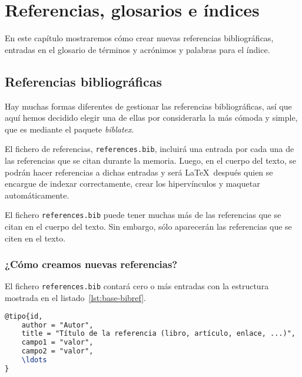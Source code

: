 \chapter{Referencias, glosarios e índices}
\label{ch:referencias}

En este capítulo mostraremos cómo crear nuevas referencias bibliográficas, entradas en el glosario de términos y acrónimos y palabras para el índice.

\section{Referencias bibliográficas}
\label{s:referencias-bibliograficas}

Hay muchas formas diferentes de gestionar las referencias bibliográficas, así que aquí hemos decidido elegir una de ellas por considerarla la más cómoda y simple, que es mediante el paquete \textit{biblatex}.

El fichero de referencias, \texttt{references.bib}, incluirá una entrada por cada una de las referencias que se citan durante la memoria. Luego, en el cuerpo del texto, se podrán hacer referencias a dichas entradas y será \LaTeX~después quien se encargue de indexar correctamente, crear los hipervínculos y maquetar automáticamente.

El fichero \texttt{references.bib} puede tener muchas más de las referencias que se citan en el cuerpo del texto. Sin embargo, sólo aparecerán las referencias que se citen en el texto.

 
\subsection{¿Cómo creamos nuevas referencias?}

El fichero \texttt{references.bib} contará cero o más entradas con la estructura mostrada en el listado~\ref{lst:base-bibref}.

\begin{lstlisting}[language=tex,caption=Estructura general de una referencia,label=lst:base-bibref]
@tipo{id,
    author = "Autor",
    title = "Título de la referencia (libro, artículo, enlace, ...)",
    campo1 = "valor",
    campo2 = "valor",
    \ldots
}
\end{lstlisting}


